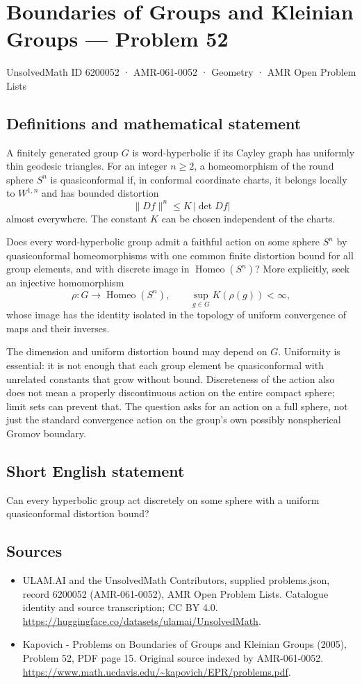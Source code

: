 \documentclass[11pt,a4paper]{article}
\begin{document}
\section*{Boundaries of Groups and Kleinian Groups — Problem 52}\label{6200052}
{\small UnsolvedMath ID 6200052 · AMR-061-0052 · Geometry · AMR Open Problem Lists}
\subsection{Definitions and mathematical statement}
A finitely generated group $G$ is word-hyperbolic if its Cayley graph has uniformly thin geodesic triangles. For an integer $n\geq2$, a homeomorphism of the round sphere $S^n$ is quasiconformal if, in conformal coordinate charts, it belongs locally to $W^{1,n}$ and has bounded distortion
\[
 \lVert Df\rVert^n\leq K\,|\det Df|
\]
almost everywhere. The constant $K$ can be chosen independent of the charts.

Does every word-hyperbolic group admit a faithful action on some sphere $S^n$ by quasiconformal homeomorphisms with one common finite distortion bound for all group elements, and with discrete image in $\operatorname{Homeo}(S^n)$? More explicitly, seek an injective homomorphism
\[
 \rho:G\longrightarrow\operatorname{Homeo}(S^n),\qquad
 \sup_{g\in G}K(\rho(g))<\infty,
\]
whose image has the identity isolated in the topology of uniform convergence of maps and their inverses.

The dimension and uniform distortion bound may depend on $G$. Uniformity is essential: it is not enough that each group element be quasiconformal with unrelated constants that grow without bound. Discreteness of the action also does not mean a properly discontinuous action on the entire compact sphere; limit sets can prevent that. The question asks for an action on a full sphere, not just the standard convergence action on the group's own possibly nonspherical Gromov boundary.
\subsection{Short English statement}
Can every hyperbolic group act discretely on some sphere with a uniform quasiconformal distortion bound?
\subsection{Sources}
\begin{itemize}
\item[S1] ULAM.AI and the UnsolvedMath Contributors, supplied problems.json, record 6200052 (AMR-061-0052), AMR Open Problem Lists. Catalogue identity and source transcription; CC BY 4.0.
\url{https://huggingface.co/datasets/ulamai/UnsolvedMath}.
\item[S2] Kapovich - Problems on Boundaries of Groups and Kleinian Groups (2005), Problem 52, PDF page 15. Original source indexed by AMR-061-0052.
\url{https://www.math.ucdavis.edu/~kapovich/EPR/problems.pdf}.
\end{itemize}
\end{document}
